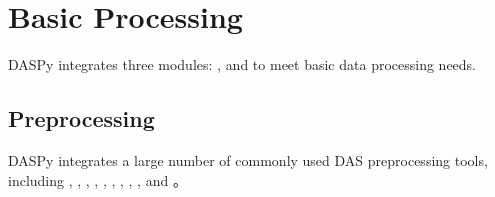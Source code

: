 \documentclass[letterpaper,10pt,english]{sphinxmanual}
\begin{document}
\begin{sphinxVerbatim}[commandchars=\\\{\}]
  \PYG{p}{[}\PYG{p}{[}   \PYG{p}{]}
\PYG{g+go}{                  [\PYGZsq{}time\PYGZus{}integration\PYGZsq{}, dict()]]}
  
\end{sphinxVerbatim}

\sphinxstepscope


\section{Basic Processing}
\label{\detokenize{Basic Processing:basic-processing}}\label{\detokenize{Basic Processing::doc}}
\sphinxAtStartPar
DASPy integrates three modules: {\hyperref[\detokenize{Basic Processing:preprocessing}]{}}, {\hyperref[\detokenize{Basic Processing:filtering}]{}} and {\hyperref[\detokenize{Basic Processing:frequency-attribute}]{}} to meet basic data processing needs.


\subsection{Preprocessing}
\label{\detokenize{Basic Processing:preprocessing}}\label{\detokenize{Basic Processing:id1}}
\sphinxAtStartPar
DASPy integrates a large number of commonly used DAS preprocessing tools, including  ,  ,  ,  ,  ,  ,  ,  ,  ,  and  。
\end{document}
